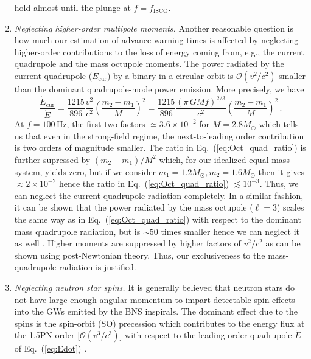 \documentclass[prd,amsmath,amssymb,aps,floats,amsfonts,notitlepage,superscriptaddress,eqsecnum,nofootinbib,10pt]{revtex4-1}
\newcommand{\ord}{\mathcal{O}}
\newcommand{\f}{\frac}
\newcommand{\be}{\begin{equation}}
\newcommand{\ee}{\end{equation}}
\begin{document}
\begin{enumerate}
hold almost until the plunge at $f=f_\text{ISCO}$.
%
\item {\it Neglecting higher-order multipole moments.}
Another reasonable question is how much our estimation of advance warning times is
affected by neglecting higher-order contributions to the loss of energy coming from, e.g., the current quadrupole and the mass octupole moments.
The power radiated by the current
quadrupole ($\dot{E}_\text{cur}$) by a binary in a circular orbit is $\ord(v^2/c^2)$ smaller than the dominant quadrupole-mode power emission. More precisely, we have \cite{Maggiore}
%
\be
\f{\dot{E}_\text{cur}}{\dot{E}} = \f{1215}{896} \f{v^2}{c^2}\left(\f{m_2-m_1}{M}\right)^2=\f{1215}{896}\f{(\pi\, G M f)^{2/3}}{c^2}\left(\f{m_2-m_1}{M}\right)^2\, . \label{eq:Oct_quad_ratio}
\ee
%
At $f=100\,$Hz, the first two factors $\simeq 3.6\times 10^{-2}$ for $M=2.8 M_\odot$ which tells us that even in the strong-field regime, 
the next-to-leading order contribution is two orders of magnitude smaller.
The ratio in Eq.~(\ref{eq:Oct_quad_ratio}) is further supressed by $(m_2-m_1)/M^2$ which, for our idealized equal-mass system, 
yields zero, but if we consider $m_1=1.2 M_\odot, m_2=1.6 M_\odot$ then it gives $\approx 2\times 10^{-2}$ hence the ratio in Eq.~(\ref{eq:Oct_quad_ratio}) $\lesssim 10^{-3}$.
Thus, we can neglect the current-quadrupole radiation completely. In a similar fashion, it can be shown that the power radiated by the mass octupole ($\ell=3$)
scales the same way as in Eq.~(\ref{eq:Oct_quad_ratio}) with respect to the dominant mass quadrupole radiation, but is $\sim 50$ times smaller hence we can neglect it as well \cite{Maggiore}.
Higher moments are suppressed by higher factors of $v^2/c^2$ as can be shown using post-Newtonian theory. 
Thus, our exclusiveness to the mass-quadrupole radiation is justified.
% 
%
\item {\it Neglecting neutron star spins.}
It is generally believed that neutron stars do not have large enough angular momentum to impart detectable spin effects into the GWs emitted by the BNS inspirals.
The dominant effect due to the spins is the spin-orbit (SO) precession which contributes to the energy flux at the 1.5PN order [$\ord(v^3/c^3)$] with respect to the leading-order quadrupole $\dot{E}$ of Eq.~(\ref{eq:Edot}) \cite{Blanchet_LRR}. 

\end{enumerate}
\end{document}
